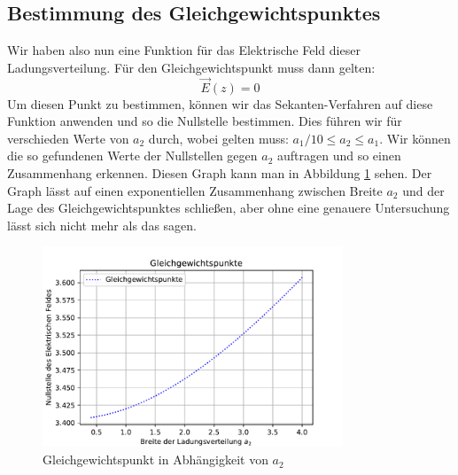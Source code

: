 \documentclass[12pt,a4paper]{article}
\begin{document}
\subsection{Bestimmung des Gleichgewichtspunktes}
Wir haben also nun eine Funktion für das Elektrische Feld dieser Ladungsverteilung. Für den Gleichgewichtspunkt muss dann gelten:
\begin{equation*}
	\vec{E}(z) = 0
\end{equation*}
Um diesen Punkt zu bestimmen, können wir das Sekanten-Verfahren auf diese Funktion anwenden und so die Nullstelle bestimmen. Dies führen wir für verschieden Werte von $a_2$ durch, wobei gelten muss: $a_1/10 \leq a_2 \leq a_1$. Wir können die so gefundenen Werte der Nullstellen gegen $a_2$ auftragen und so einen Zusammenhang erkennen. Diesen Graph kann man in Abbildung \ref{f:nullstellen} sehen. Der Graph lässt auf einen exponentiellen Zusammenhang zwischen Breite $a_2$ und der Lage des Gleichgewichtspunktes schließen, aber ohne eine genauere Untersuchung lässt sich nicht mehr als das sagen.
\begin{figure}[htbp]
	\includegraphics[width=0.8\textwidth]{Nullstellen.pdf}
	\caption{Gleichgewichtspunkt in Abhängigkeit von $a_2$}
	\label{f:nullstellen}
\end{figure}
\newpage
\listoffigures
\end{document}
